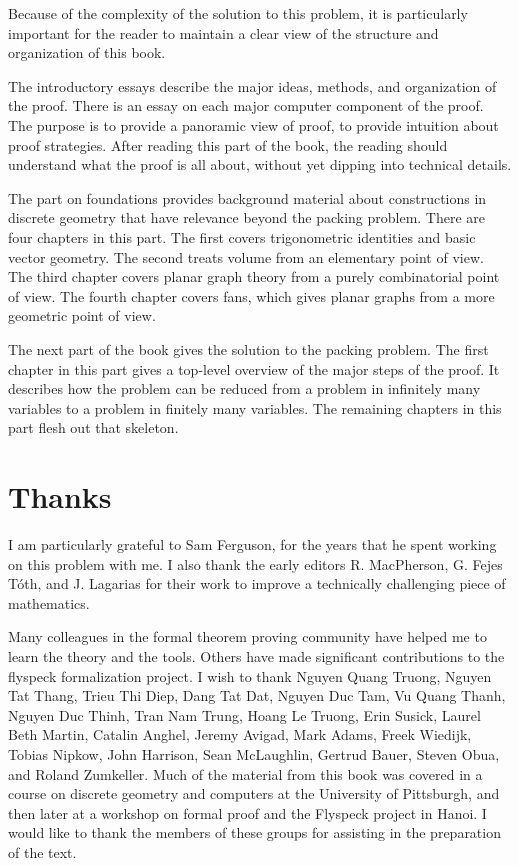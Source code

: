 Because of the complexity of the solution to this problem, it is particularly important for the reader to maintain a clear view of the structure and organization of this book. 


The introductory essays describe the major ideas,  methods, and organization of the proof.  There is an essay on each major computer component of the proof. The purpose is to provide a panoramic view of proof, to provide intuition about proof strategies.  After reading this part of the book, the reading should understand what the proof is all about, without yet dipping into technical details.  

The part on foundations provides background material about constructions in discrete geometry that have relevance beyond the packing problem.  There are four chapters in this part.  The first covers trigonometric identities and basic vector geometry.  The second treats volume from an elementary point of view.  The third chapter covers planar graph theory from a purely combinatorial point of view.  The fourth chapter covers fans, which gives planar graphs from a more geometric point of view.

The next part of the book gives the solution to the packing problem.  The first chapter in this part gives a top-level overview of the major steps of the proof.  It describes how the problem can be reduced from a problem in infinitely many variables to a problem in finitely many variables.  The remaining chapters in this part flesh out that skeleton.






\section{Thanks}

I am particularly grateful to Sam Ferguson, for the years that
he spent working on this problem with me.  I also thank the early editors
R. MacPherson, G. Fejes T\'oth, and J. Lagarias for their work
to improve a technically challenging piece of mathematics.  

Many colleagues in the formal theorem proving community have helped me to learn the theory and the tools.  Others have made significant contributions to the flyspeck formalization project.  I wish to thank 
Nguyen Quang Truong, %
Nguyen Tat Thang, %
Trieu Thi Diep, Dang Tat Dat, Nguyen Duc Tam, Vu Quang Thanh, Nguyen Duc Thinh, Tran Nam Trung, Hoang Le Truong,
Erin Susick, Laurel Beth Martin, Catalin Anghel,
Jeremy Avigad, Mark Adams, Freek Wiedijk,  Tobias Nipkow, John Harrison, Sean McLaughlin, Gertrud Bauer, Steven Obua, and Roland Zumkeller.   Much of the material from this book was covered in a course on discrete geometry and computers at the University of Pittsburgh, and then later at a workshop on formal proof and the Flyspeck project in Hanoi.  I would like to thank the members of these groups for assisting in the preparation of the text.

